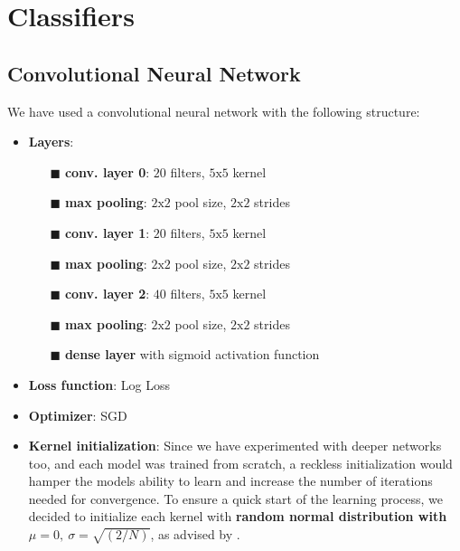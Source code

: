     \section{Classifiers}
        \subsection{Convolutional Neural Network}
        We have used a convolutional neural network with the following structure:
        \begin{itemize}
            \item \textbf{Layers}:
            \begin{itemize}
            \item[$\blacksquare$] \textbf{conv. layer 0}: $20$ filters, $5 \text{x} 5$ kernel
            \item[$\blacksquare$] \textbf{max pooling}: $2 \text{x} 2$ pool size, $2 \text{x} 2$ strides
            \item[$\blacksquare$] \textbf{conv. layer 1}: $20$ filters, $5 \text{x} 5$ kernel
            \item[$\blacksquare$] \textbf{max pooling}: $2 \text{x} 2$ pool size, $2 \text{x} 2$ strides
            \item[$\blacksquare$] \textbf{conv. layer 2}: $40$ filters, $5 \text{x} 5$ kernel
            \item[$\blacksquare$] \textbf{max pooling}: $2 \text{x} 2$ pool size, $2 \text{x} 2$ strides
            \item[$\blacksquare$] \textbf{dense layer} with sigmoid activation function
            \end{itemize}
            \item \textbf{Loss function}: Log Loss
            \item \textbf{Optimizer}: SGD
            \item \textbf{Kernel initialization}: Since we have experimented with deeper
            networks too, and each model was trained from scratch, a reckless initialization
            would hamper the models ability to learn and increase the number of
            iterations needed for convergence. To ensure a quick start of the learning
            process, we decided to initialize each kernel with \textbf{random normal
            distribution with $\mu = 0,\ \sigma = \sqrt{(2 / N)}$}, as advised by
            \citeauthor{initialization}.
        \end{itemize}


